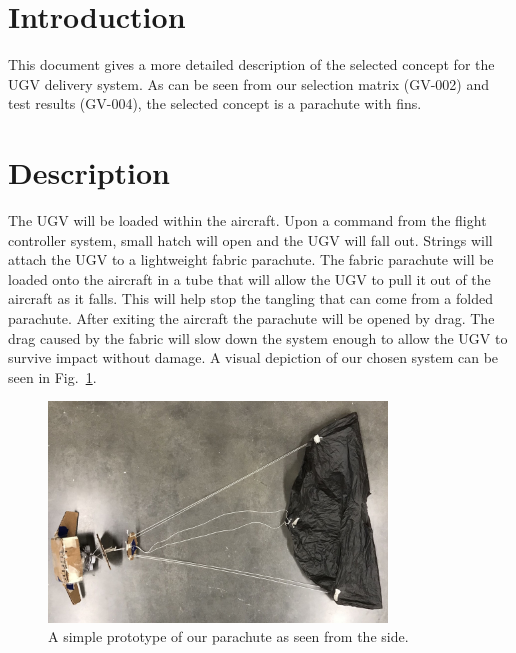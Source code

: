 \documentclass[]{auvsi_doc}
\begin{document}
\begin{AUVSITitlePage}
\begin{artifacttable}
\end{artifacttable}
\end{AUVSITitlePage}

\section{Introduction}
This document gives a more detailed description of the selected concept for the UGV delivery system. As can be seen from our selection matrix (GV-002) and test results (GV-004), the selected concept is a parachute with fins.

\section{Description}

The UGV will be loaded within the aircraft. Upon a command from the flight controller system, small hatch will open and the UGV will fall out. Strings will attach the UGV to a lightweight fabric parachute. The fabric parachute will be loaded onto the aircraft in a tube that will allow the UGV to pull it out of the aircraft as it falls. This will help stop the tangling that can come from a folded parachute. After exiting the aircraft the parachute will be opened by drag. The drag caused by the fabric will slow down the system enough to allow the UGV to survive impact without damage. A visual depiction of our chosen system can be seen in Fig.~\ref{fig:side}.

\begin{figure}[h]
\centering
\includegraphics[width=90mm]{./figs/Parachute_Side.jpg}
\caption{A simple prototype of our parachute as seen from the side.}
\label{fig:side}
\end{figure}
\end{document}

